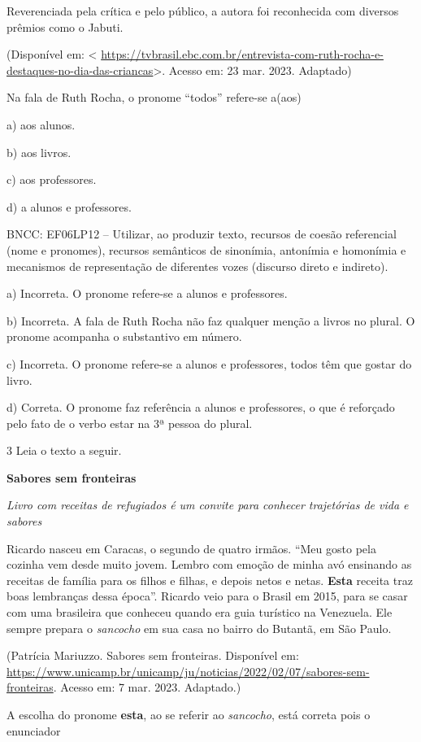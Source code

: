 Reverenciada pela crítica e pelo público, a autora foi reconhecida com
diversos prêmios como o Jabuti.

(Disponível em: \textless{}
\url{https://tvbrasil.ebc.com.br/entrevista-com-ruth-rocha-e-destaques-no-dia-das-criancas}\textgreater.
Acesso em: 23 mar. 2023. Adaptado)

Na fala de Ruth Rocha, o pronome ``todos'' refere-se a(aos)

a) aos alunos.

b) aos livros.

c) aos professores.

d) a alunos e professores.

BNCC: EF06LP12 -- Utilizar, ao produzir texto, recursos de coesão
referencial (nome e pronomes), recursos semânticos de sinonímia,
antonímia e homonímia e mecanismos de representação de diferentes vozes
(discurso direto e indireto).

a) Incorreta. O pronome refere-se a alunos e professores.

b) Incorreta. A fala de Ruth Rocha não faz qualquer menção a livros no
plural. O pronome acompanha o substantivo em número.

c) Incorreta. O pronome refere-se a alunos e professores, todos têm que
gostar do livro.

d) Correta. O pronome faz referência a alunos e professores, o que é
reforçado pelo fato de o verbo estar na 3ª pessoa do plural.

\num{3} Leia o texto a seguir.

\textbf{Sabores sem fronteiras}

\emph{Livro com receitas de refugiados é um convite para conhecer
trajetórias de vida e sabores}

Ricardo nasceu em Caracas, o segundo de quatro irmãos. ``Meu gosto pela
cozinha vem desde muito jovem. Lembro com emoção de minha avó ensinando
as receitas de família para os filhos e filhas, e depois netos e netas.
\textbf{Esta} receita traz boas lembranças dessa época''. Ricardo veio
para o Brasil em 2015, para se casar com uma brasileira que conheceu
quando era guia turístico na Venezuela. Ele sempre prepara o
\emph{sancocho} em sua casa no bairro do Butantã, em São Paulo.

(Patrícia Mariuzzo. Sabores sem fronteiras. Disponível em:
\url{https://www.unicamp.br/unicamp/ju/noticias/2022/02/07/sabores-sem-fronteiras}.
Acesso em: 7 mar. 2023. Adaptado.)

A escolha do pronome \textbf{esta}, ao se referir ao \emph{sancocho},
está correta pois o enunciador

